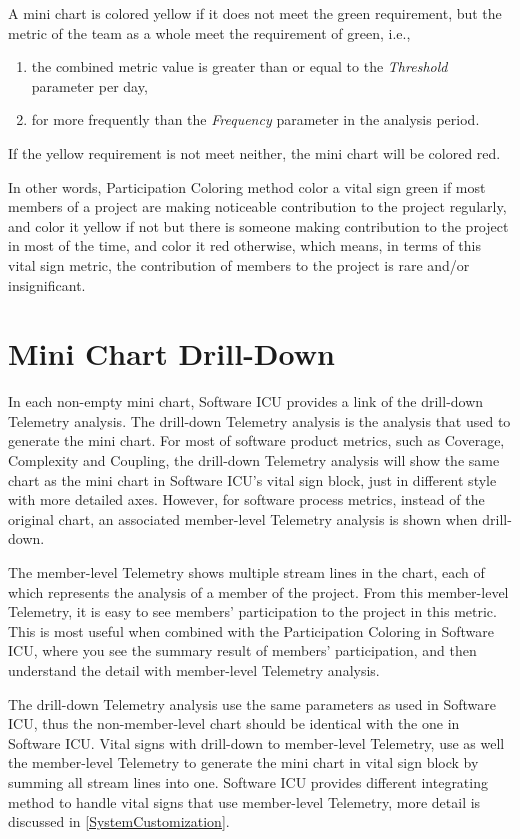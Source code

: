 A mini chart is colored yellow if it does not meet the green requirement, but the metric of the team as a whole meet the requirement of green, i.e., 
\begin{enumerate}
\item the combined metric value is greater than or equal to the {\it Threshold} parameter per day,
\item for more frequently than the {\it Frequency} parameter in the analysis period.
\end{enumerate}

If the yellow requirement is not meet neither, the mini chart will be colored red.

In other words, Participation Coloring method color a vital sign green if most members of a project are making noticeable contribution to the project regularly, and color it yellow if not but there is someone making contribution to the project in most of the time, and color it red otherwise, which means, in terms of this vital sign metric, the contribution of members to the project is rare and/or insignificant.

\section{Mini Chart Drill-Down}
In each non-empty mini chart, Software ICU provides a link of the drill-down Telemetry analysis. The drill-down Telemetry analysis is the analysis that used to generate the mini chart. For most of software product metrics, such as Coverage, Complexity and Coupling, the drill-down Telemetry analysis will show the same chart as the mini chart in Software ICU's vital sign block, just in different style with more detailed axes. However, for software process metrics, instead of the original chart, an associated member-level Telemetry analysis is shown when drill-down. 

The member-level Telemetry shows multiple stream lines in the chart, each of which represents the analysis of a member of the project. From this member-level Telemetry, it is easy to see members' participation to the project in this metric. This is most useful when combined with the Participation Coloring in Software ICU, where you see the summary result of members' participation, and then understand the detail with member-level Telemetry analysis.

The drill-down Telemetry analysis use the same parameters as used in Software ICU, thus the non-member-level chart should be identical with the one in Software ICU. Vital signs with drill-down to member-level Telemetry, use as well the member-level Telemetry to generate the mini chart in vital sign block by summing all stream lines into one. Software ICU provides different integrating method to handle vital signs that use member-level Telemetry, more detail is discussed in \autoref{SystemCustomization}.

